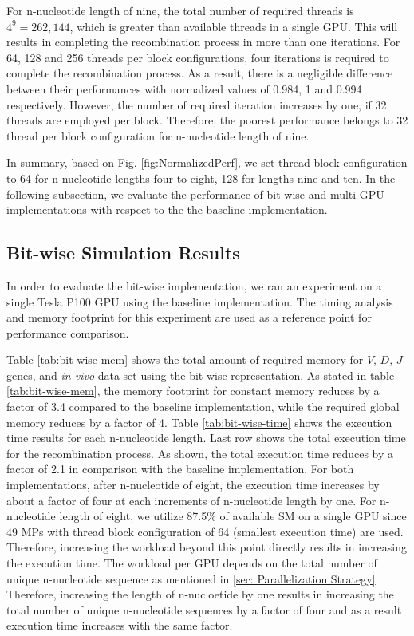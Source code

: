 For n-nucleotide length of nine, the total number of required threads is $4^9= 262,144$, which is greater than available threads in a single GPU. This will results in completing the recombination process in more than one iterations. For 64, 128 and 256 threads per block configurations, four iterations is required to complete the recombination process. As a result, there is a negligible difference between their performances with normalized values of 0.984, 1 and 0.994 respectively. However, the number of required iteration increases by one, if 32 threads are employed per block. Therefore, the poorest performance belongs to 32 thread per block configuration for n-nucleotide length of nine. 

 
In summary, based on  Fig. \ref{fig:NormalizedPerf}, we set thread block configuration to 64 for n-nucleotide lengths four to eight, 128 for lengths nine and ten. In the following subsection, we evaluate the performance of bit-wise and multi-GPU implementations with respect to the the baseline implementation. 


\subsection {Bit-wise Simulation Results}
In order to evaluate the bit-wise implementation, we ran an experiment on a single Tesla P100 GPU using the baseline implementation. The timing analysis and memory footprint for this experiment are used as a reference point for performance comparison.  

Table \ref{tab:bit-wise-mem} shows the total amount of required memory for $V$, $D$, $J$ genes, and \emph{in vivo} data set using the bit-wise representation. As stated in table \ref{tab:bit-wise-mem}, the memory footprint for constant memory reduces by a factor of 3.4 compared to the baseline implementation, while the required global memory reduces by a factor of 4. Table \ref{tab:bit-wise-time} shows the execution time results for each n-nucleotide length. Last row shows the total execution time for the recombination process.  As shown, the total execution time reduces by a factor of 2.1 in comparison with the baseline implementation. 
For both implementations, after n-nucleotide of eight, the execution time increases by about a factor of four at each increments of n-nucleotide length by one. For n-nucleotide length of eight, we utilize  87.5\% of available SM on a single GPU since 49 MPs with thread block configuration of 64 (smallest execution time) are used. Therefore, increasing the workload beyond this point directly results in increasing the execution time. The workload per GPU depends on the total number of unique n-nucleotide sequence as mentioned in \ref{sec: Parallelization Strategy}. Therefore, increasing the length of n-nucloetide by one results in increasing the total number of unique n-nucleotide sequences by a factor of four and as a result execution time increases with the same factor.   

